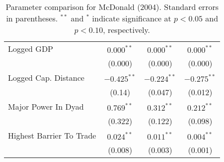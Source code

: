 \begin{table}[ht]
\begin{tabular}{lccc}
  Logged GDP & $0.000^{\ast\ast}$ & $0.000^{\ast\ast}$ & $0.000^{\ast\ast}$ \\ 
   & (0.000) & (0.000) & (0.000) \\ 
  Logged Cap. Distance & $-0.425^{\ast\ast}$ & $-0.224^{\ast\ast}$ & $-0.275^{\ast\ast}$ \\ 
   & (0.14) & (0.047) & (0.012) \\ 
  Major Power In Dyad & $0.769^{\ast\ast}$ & $0.312^{\ast\ast}$ & $0.212^{\ast\ast}$ \\ 
   & (0.322) & (0.122) & (0.098) \\ 
  Highest Barrier To Trade & $0.024^{\ast\ast}$ & $0.011^{\ast\ast}$ & $0.004^{\ast\ast}$ \\ 
   & (0.008) & (0.003) & (0.001) \\ 
   \hline
\hline
\end{tabular}
\endgroup
\caption{Parameter comparison for McDonald (2004). Standard errors in parentheses. $^{**}$ and $^{*}$ indicate significance at $p<0.05$ and $p<0.10$, respectively.} 
\label{tab:mcdonald_coef}
\end{table}
